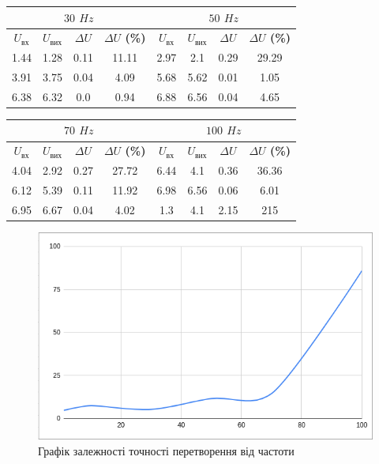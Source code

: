 \documentclass{article}
\begin{document}
\begin{normalsize}
	\begin{table}[H]
		\centering
		\renewcommand*\arraystretch{1.3}
		\begin{tabular}{|c|c|c|c|c|c|c|c|}
			\hline
			\multicolumn{4}{|c|}{\textbf{$30$ $Hz$}} & \multicolumn{4}{c|}{\textbf{$50$ $Hz$}} \\
			\hline
			\textbf{$U_{\text{вх}}$} & \textbf{$U_{\text{вих}}$} & \textbf{$\Delta U$} & \textbf{$\Delta U$ (\%)} & \textbf{$U_{\text{вх}}$} & \textbf{$U_{\text{вих}}$} & \textbf{$\Delta U$} & \textbf{$\Delta U$ (\%)} \\
			\hline
			1.44&1.28&0.11&11.11&2.97&2.1&0.29&29.29\\
			\hline
			3.91&3.75&0.04&4.09&5.68&5.62&0.01&1.05\\
			\hline
			6.38&6.32&0.0&0.94&6.88&6.56&0.04&4.65\\
			\hline
		\end{tabular}
	\end{table}
	
	\begin{table}[H]
		\centering
		\renewcommand*\arraystretch{1.3}
		\begin{tabular}{|c|c|c|c|c|c|c|c|}
			\hline
			\multicolumn{4}{|c|}{\textbf{$70$ $Hz$}} & \multicolumn{4}{c|}{\textbf{$100$ $Hz$}} \\
			\hline
			\textbf{$U_{\text{вх}}$} & \textbf{$U_{\text{вих}}$} & \textbf{$\Delta U$} & \textbf{$\Delta U$ (\%)} & \textbf{$U_{\text{вх}}$} & \textbf{$U_{\text{вих}}$} & \textbf{$\Delta U$} & \textbf{$\Delta U$ (\%)} \\
			\hline
			4.04&2.92&0.27&27.72&6.44&4.1&0.36&36.36\\
			\hline
			6.12&5.39&0.11&11.92&6.98&6.56&0.06&6.01\\
			\hline
			6.95&6.67&0.04&4.02&1.3&4.1&2.15&215\\
			\hline
		\end{tabular}
	\end{table}
	
	\begin{figure}[H]
		\centering
		\includegraphics[width=\textwidth]{4}
		\caption{Графік залежності  точності перетворення від частоти}
	\end{figure}
	

\end{normalsize}
\end{document}
